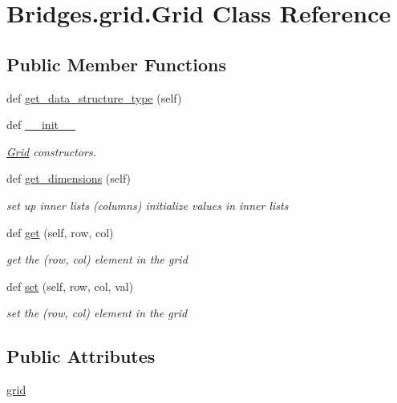\hypertarget{class_bridges_1_1grid_1_1_grid}{}\section{Bridges.\+grid.\+Grid Class Reference}
\label{class_bridges_1_1grid_1_1_grid}
\subsection*{Public Member Functions}
\begin{DoxyCompactItemize}
\item 
def \hyperlink{class_bridges_1_1grid_1_1_grid_a0cb08704bb8f54b6f20329549e757fb6}{get\+\_\+data\+\_\+structure\+\_\+type} (self)
\item 
def \hyperlink{class_bridges_1_1grid_1_1_grid_aa6ae5fa0e2e314ac2673408c83fca994}{\+\_\+\+\_\+init\+\_\+\+\_\+}
\begin{DoxyCompactList}\small\item\em \hyperlink{class_bridges_1_1grid_1_1_grid}{Grid} constructors. \end{DoxyCompactList}\item 
def \hyperlink{class_bridges_1_1grid_1_1_grid_af8fc8340800ea13079c61c41ce3a755c}{get\+\_\+dimensions} (self)
\begin{DoxyCompactList}\small\item\em set up inner lists (columns) initialize values in inner lists \end{DoxyCompactList}\item 
def \hyperlink{class_bridges_1_1grid_1_1_grid_a07a9aaa131b3bf32d02d996b533d765d}{get} (self, row, col)
\begin{DoxyCompactList}\small\item\em get the (row, col) element in the grid \end{DoxyCompactList}\item 
def \hyperlink{class_bridges_1_1grid_1_1_grid_ab55f697cf4c4d4e712b3ee4e08328d9c}{set} (self, row, col, val)
\begin{DoxyCompactList}\small\item\em set the (row, col) element in the grid \end{DoxyCompactList}\end{DoxyCompactItemize}
\subsection*{Public Attributes}
\begin{DoxyCompactItemize}
\item 
\hyperlink{class_bridges_1_1grid_1_1_grid_a4092dc06236eaac61aecc347b0b4b63e}{grid}
\end{DoxyCompactItemize}
